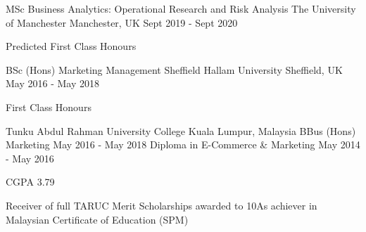 

\begin{cventries}

  \cventry
    {MSc Business Analytics: Operational Research and Risk Analysis} %
    {The University of Manchester} %
    {Manchester, UK} %
    {Sept 2019 - Sept 2020} %
    {
      \begin{cvitems} %
        \item{Predicted First Class Honours}
      \end{cvitems}
    }

  \cventry
    {BSc (Hons) Marketing Management} %
    {Sheffield Hallam University} %
    {Sheffield, UK} %
    {May 2016 - May 2018} %
    {
      \begin{cvitems} %
        \item {First Class Honours}
      \end{cvitems}
    }  

\end{cventries}

\begin{cvedus}
  \cvedu
    {Tunku Abdul Rahman University College} %
    {Kuala Lumpur, Malaysia}
    {BBus (Hons) Marketing} %
    {May 2016 - May 2018} %
    {Diploma in E-Commerce \&  Marketing} %
    {May 2014 - May 2016}
    {
      \begin{cvitems} %
        \item {CGPA 3.79}
        \item {Receiver of full TARUC Merit Scholarships awarded to 10As achiever in Malaysian Certificate of Education (SPM)}
      \end{cvitems}
    }
\end{cvedus}